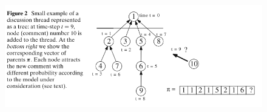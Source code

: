 \documentclass[10pt,a4paper]{article}
\begin{document}
\begin{figure}
\includegraphics[scale=0.5]{pis}
\end{figure}
\end{document}
